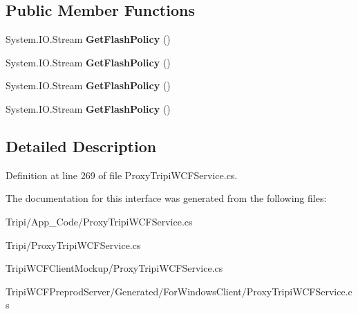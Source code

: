 \subsection*{Public Member Functions}
\begin{DoxyCompactItemize}
\item 
\hypertarget{interface_tripi_w_c_f_1_1_client_mockup_1_1_proxy_1_1_i_cross_domain_policy_responder_a1412f9531b7ccfe925d28915757b66df}{
System.IO.Stream {\bfseries GetFlashPolicy} ()}
\label{interface_tripi_w_c_f_1_1_client_mockup_1_1_proxy_1_1_i_cross_domain_policy_responder_a1412f9531b7ccfe925d28915757b66df}

\item 
\hypertarget{interface_tripi_w_c_f_1_1_client_mockup_1_1_proxy_1_1_i_cross_domain_policy_responder_a1412f9531b7ccfe925d28915757b66df}{
System.IO.Stream {\bfseries GetFlashPolicy} ()}
\label{interface_tripi_w_c_f_1_1_client_mockup_1_1_proxy_1_1_i_cross_domain_policy_responder_a1412f9531b7ccfe925d28915757b66df}

\item 
\hypertarget{interface_tripi_w_c_f_1_1_client_mockup_1_1_proxy_1_1_i_cross_domain_policy_responder_a1412f9531b7ccfe925d28915757b66df}{
System.IO.Stream {\bfseries GetFlashPolicy} ()}
\label{interface_tripi_w_c_f_1_1_client_mockup_1_1_proxy_1_1_i_cross_domain_policy_responder_a1412f9531b7ccfe925d28915757b66df}

\item 
\hypertarget{interface_tripi_w_c_f_1_1_client_mockup_1_1_proxy_1_1_i_cross_domain_policy_responder_a1412f9531b7ccfe925d28915757b66df}{
System.IO.Stream {\bfseries GetFlashPolicy} ()}
\label{interface_tripi_w_c_f_1_1_client_mockup_1_1_proxy_1_1_i_cross_domain_policy_responder_a1412f9531b7ccfe925d28915757b66df}

\end{DoxyCompactItemize}


\subsection{Detailed Description}


Definition at line 269 of file ProxyTripiWCFService.cs.

The documentation for this interface was generated from the following files:\begin{DoxyCompactItemize}
\item 
Tripi/App\_\-Code/ProxyTripiWCFService.cs\item 
Tripi/ProxyTripiWCFService.cs\item 
TripiWCFClientMockup/ProxyTripiWCFService.cs\item 
TripiWCFPreprodServer/Generated/ForWindowsClient/ProxyTripiWCFService.cs\end{DoxyCompactItemize}

